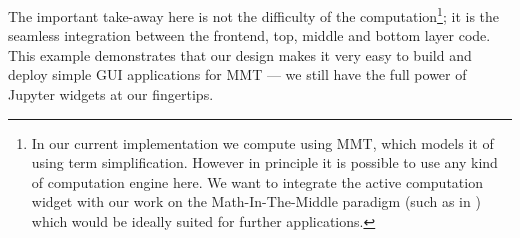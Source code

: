 The important take-away here is not the difficulty of the computation\footnote{
  In our current implementation we compute using MMT, which models it of using term simplification. 
  However in principle it is possible to use any kind of computation engine here. 
  We want to integrate the active computation widget with our work on the Math-In-The-Middle paradigm (such as in \cite{ODK-D6.5}) which would be ideally suited for further applications. 
}; it is the seamless integration between the frontend, top, middle and bottom layer code. 
This example demonstrates that our design makes it very easy to build and deploy simple GUI applications for MMT --- we still have the full power of Jupyter widgets at our fingertips. 


